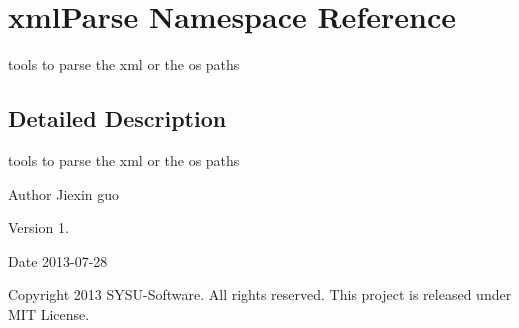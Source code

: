 \hypertarget{namespacexml_parse}{\section{xml\-Parse Namespace Reference}
\label{namespacexml_parse}
}


tools to parse the xml or the os paths  




\subsection{Detailed Description}
tools to parse the xml or the os paths \begin{DoxyAuthor}{Author}
Jiexin guo 
\end{DoxyAuthor}
\begin{DoxyVersion}{Version}
1. 
\end{DoxyVersion}
\begin{DoxyDate}{Date}
2013-\/07-\/28 
\end{DoxyDate}
\begin{DoxyCopyright}{Copyright}
2013 S\-Y\-S\-U-\/\-Software. All rights reserved. This project is released under M\-I\-T License. 
\end{DoxyCopyright}
